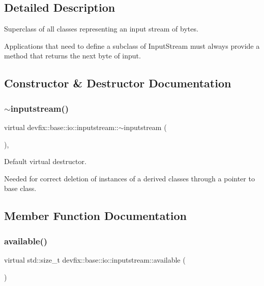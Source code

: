 \subsection{Detailed Description}
Superclass of all classes representing an input stream of bytes. 

Applications that need to define a subclass of Input\+Stream must always provide a method that returns the next byte of input. 

\subsection{Constructor \& Destructor Documentation}
\mbox{\label{structdevfix_1_1base_1_1io_1_1inputstream_a1da9f4c189be9ee315caabd2b4fdc125}} 
\subsubsection{\texorpdfstring{$\sim$inputstream()}{~inputstream()}}
{\footnotesize\ttfamily virtual devfix\+::base\+::io\+::inputstream\+::$\sim$inputstream (\begin{DoxyParamCaption}{ }\end{DoxyParamCaption})\hspace{0.3cm}{\ttfamily [virtual]}, {\ttfamily [default]}}



Default virtual destructor. 

Needed for correct deletion of instances of a derived classes through a pointer to base class. 

\subsection{Member Function Documentation}
\mbox{\label{structdevfix_1_1base_1_1io_1_1inputstream_ace04813af676b6c81fa452eb4d81a796}} 
\subsubsection{\texorpdfstring{available()}{available()}}
{\footnotesize\ttfamily virtual std\+::size\+\_\+t devfix\+::base\+::io\+::inputstream\+::available (\begin{DoxyParamCaption}{ }\end{DoxyParamCaption})\hspace{0.3cm}{\ttfamily [pure virtual]}}



